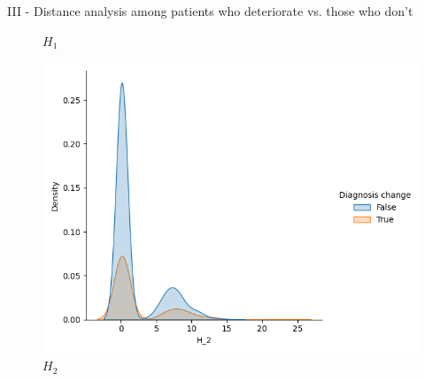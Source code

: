 \documentclass[aspectratio=169, 10pt, dvipsnames]{beamer}
\begin{document}
\begin{frame}[fragile]{III - Distance analysis among patients who deteriorate vs. those who don't}
\begin{figure}
    \caption{$H_1$}
  \end{figure}%
  \endminipage
  \hfill
  \begin{figure}
    \centering
     \includegraphics[width=\textwidth]{figures/temporal_evolution/landscape_H_2_dist_diag_change.png}
    \caption{$H_2$}
  \end{figure}
  \endminipage
\end{frame}
\end{document}
